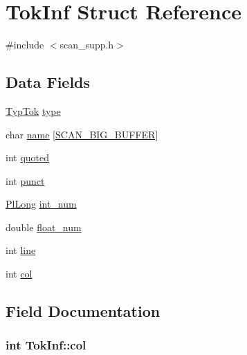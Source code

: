 \hypertarget{structTokInf}{}\section{Tok\+Inf Struct Reference}
\label{structTokInf}


{\ttfamily \#include $<$scan\+\_\+supp.\+h$>$}

\subsection*{Data Fields}
\begin{DoxyCompactItemize}
\item 
\hyperlink{scan__supp_8h_a92e3dba2da3b5e64ff0567a8aa779891}{Typ\+Tok} \hyperlink{structTokInf_a9ae46e898f23f677836fa19cc119276b}{type}
\item 
char \hyperlink{structTokInf_aa56c61670fa2e571afc6647c76af2103}{name} \mbox{[}\hyperlink{scan__supp_8h_ac61c2e9163da6fb2b5fcd9a86c88af5d}{S\+C\+A\+N\+\_\+\+B\+I\+G\+\_\+\+B\+U\+F\+F\+ER}\mbox{]}
\item 
int \hyperlink{structTokInf_aedaf8feef7d9708e8a946df56d7cdb66}{quoted}
\item 
int \hyperlink{structTokInf_addc6977c79a52835a28c0347c453df5d}{punct}
\item 
\hyperlink{gprolog_8h_a4d005b136d7fb28537eb1815f7868b63}{Pl\+Long} \hyperlink{structTokInf_a9f5266be5fc6a8e446ed3e660032d0ad}{int\+\_\+num}
\item 
double \hyperlink{structTokInf_afddf6ad76bb496c8ddd35a5b773f4360}{float\+\_\+num}
\item 
int \hyperlink{structTokInf_a141b87290988df7a09d0f84593cd02c5}{line}
\item 
int \hyperlink{structTokInf_a3034cb3570c3c0a946e3e1c86b0464a7}{col}
\end{DoxyCompactItemize}


\subsection{Field Documentation}
\subsubsection[{\texorpdfstring{col}{col}}]{\setlength{\rightskip}{0pt plus 5cm}int Tok\+Inf\+::col}\hypertarget{structTokInf_a3034cb3570c3c0a946e3e1c86b0464a7}{}\label{structTokInf_a3034cb3570c3c0a946e3e1c86b0464a7}
